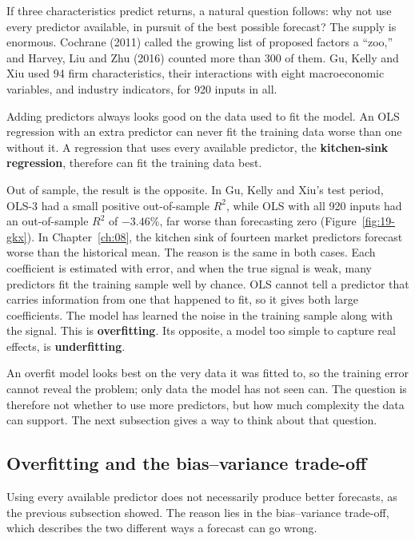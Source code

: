 If three characteristics predict returns, a natural question follows: why not use every predictor available, in pursuit of the best possible forecast? The supply is enormous. 
Cochrane (2011) called the growing list of proposed factors a ``zoo,'' and Harvey, Liu and Zhu (2016) counted more than 300 of them.
Gu, Kelly and Xiu used 94 firm characteristics, their interactions with eight macroeconomic variables, and industry indicators, for 920 inputs in all.

Adding predictors always looks good on the data used to fit the model. An OLS regression with an extra predictor can never fit the training data worse than one without it. A regression that uses every available predictor, the \textbf{kitchen-sink regression}, therefore can fit the training data best.

Out of sample, the result is the opposite. In Gu, Kelly and Xiu's test period, OLS-3 had a small positive out-of-sample $R^2$, while OLS with all 920 inputs had an out-of-sample $R^2$ of $-3.46\%$, far worse than forecasting zero (Figure~\ref{fig:19-gkx}). In Chapter~\ref{ch:08}, the kitchen sink of fourteen market predictors forecast worse than the historical mean. The reason is the same in both cases. Each coefficient is estimated with error, and when the true signal is weak, many predictors fit the training sample well by chance. OLS cannot tell a predictor that carries information from one that happened to fit, so it gives both large coefficients. The model has learned the noise in the training sample along with the signal. This is \textbf{overfitting}. Its opposite, a model too simple to capture real effects, is \textbf{underfitting}.

An overfit model looks best on the very data it was fitted to, so the training error cannot reveal the problem; only data the model has not seen can. The question is therefore not whether to use more predictors, but how much complexity the data can support. The next subsection gives a way to think about that question.

\subsection{Overfitting and the bias--variance trade-off}
\label{sec:19-biasvar}

Using every available predictor does not necessarily produce better forecasts, as the previous subsection showed. The reason lies in the bias--variance trade-off, which describes the two different ways a forecast can go wrong.

